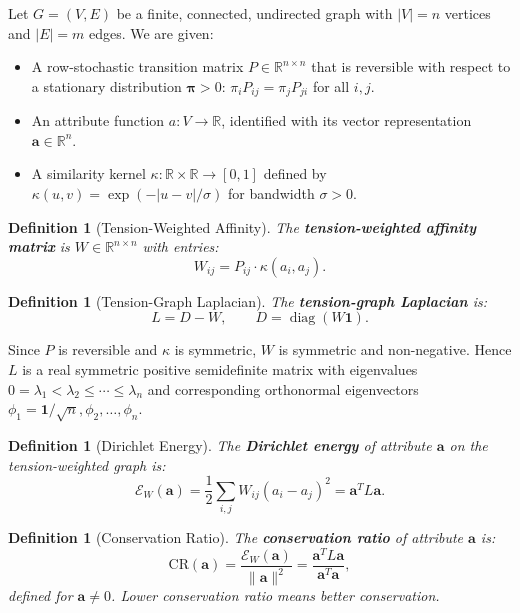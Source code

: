 \documentclass[12pt,letterpaper]{article}
\newtheorem{definition}[theorem]{Definition}
\newcommand{\R}{\mathbb{R}}
\newcommand{\One}{\mathbf{1}}
\newcommand{\bfa}{\mathbf{a}}
\newcommand{\bfpi}{\boldsymbol{\pi}}
\newcommand{\CR}{\mathrm{CR}}
\newcommand{\diag}{\operatorname{diag}}
\newcommand{\cE}{\mathcal{E}}
\begin{document}
Let $G = (V, E)$ be a finite, connected, undirected graph with $|V| = n$ vertices and $|E| = m$ edges. We are given:

\begin{itemize}
  \item A row-stochastic transition matrix $P \in \R^{n \times n}$ that is reversible with respect to a stationary distribution $\bfpi > 0$: $\pi_i P_{ij} = \pi_j P_{ji}$ for all $i, j$.
  \item An attribute function $a : V \to \R$, identified with its vector representation $\bfa \in \R^n$.
  \item A similarity kernel $\kappa : \R \times \R \to [0,1]$ defined by $\kappa(u,v) = \exp(-|u - v|/\sigma)$ for bandwidth $\sigma > 0$.
\end{itemize}

\begin{definition}[Tension-Weighted Affinity]
\label{def:tension-weight}
The \textbf{tension-weighted affinity matrix} is $W \in \R^{n \times n}$ with entries:
\[
  W_{ij} = P_{ij} \cdot \kappa(a_i, a_j).
\]
\end{definition}

\begin{definition}[Tension-Graph Laplacian]
\label{def:tension-laplacian}
The \textbf{tension-graph Laplacian} is:
\[
  L = D - W, \qquad D = \diag(W\One).
\]
\end{definition}

Since $P$ is reversible and $\kappa$ is symmetric, $W$ is symmetric and non-negative. Hence $L$ is a real symmetric positive semidefinite matrix with eigenvalues $0 = \lambda_1 < \lambda_2 \leq \cdots \leq \lambda_n$ and corresponding orthonormal eigenvectors $\phi_1 = \One/\sqrt{n}, \phi_2, \ldots, \phi_n$.

\begin{definition}[Dirichlet Energy]
\label{def:dirichlet}
The \textbf{Dirichlet energy} of attribute $\bfa$ on the tension-weighted graph is:
\[
  \cE_W(\bfa) = \frac{1}{2}\sum_{i,j} W_{ij}(a_i - a_j)^2 = \bfa^T L \bfa.
\]
\end{definition}

\begin{definition}[Conservation Ratio]
\label{def:cr}
The \textbf{conservation ratio} of attribute $\bfa$ is:
\[
  \CR(\bfa) = \frac{\cE_W(\bfa)}{\|\bfa\|^2} = \frac{\bfa^T L \bfa}{\bfa^T \bfa},
\]
defined for $\bfa \neq 0$. Lower conservation ratio means better conservation.
\end{definition}
\end{document}
